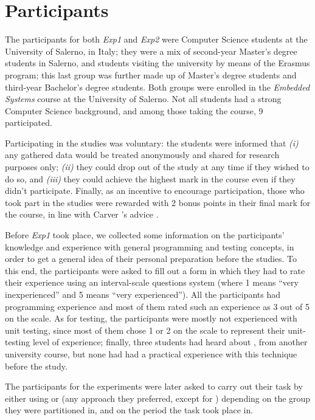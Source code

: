\section{Participants}
The participants for both \textit{Exp1} and \textit{Exp2} were Computer Science students at the University of Salerno, in Italy; they were a mix of second-year Master's degree students in Salerno, and students visiting the university by means of the Erasmus program; this last group was further made up of Master's degree students and third-year Bachelor's degree students. Both groups were enrolled in the \textit{Embedded Systems} course at the University of Salerno. Not all students had a strong Computer Science background, and among those taking the course, 9 participated. 

Participating in the studies was voluntary: the students were informed that \textit{(i)} any gathered data would be treated anonymously and shared for research purposes only; \textit{(ii)} they could drop out of the study at any time if they wished to do so, and \textit{(iii)} they could achieve the highest mark in the course even if they didn't participate. Finally, as an incentive to encourage participation, those who took part in the studies were rewarded with 2 bonus points in their final mark for the course, in line with Carver \etal's advice \cite{DBLP:conf/metrics/CarverJMS03}.

Before \textit{Exp1} took place, we collected some information on the participants' knowledge and experience with general programming and testing concepts, in order to get a general idea of their personal preparation before the studies. To this end, the participants were asked to fill out a form in which they had to rate their experience using an interval-scale questions system (where 1 means “very inexperienced” and 5 means “very experienced”). All the participants had programming experience and most of them rated such an experience as 3 out of 5 on the scale. 
As for testing, the participants were mostly not experienced with unit testing, since most of them chose 1 or 2 on the scale to represent their unit-testing level of experience; finally, three students had heard about \tdd, from another university course, but none had had a practical experience with this technique before the study.

The participants for the experiments were later asked to carry out their task by either using \tdd or \notdd (\ie any approach they preferred, except for \tdd) depending on the group they were partitioned in, and on the period the task took place in. 





